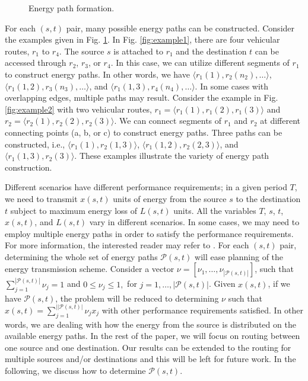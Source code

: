 \documentclass[journal]{IEEEtran}
\begin{document}
\begin{figure}[!t]
	\begin{center}
	\end{center}
	\caption{Energy path formation.}
  \label{fig:routeformation}
\end{figure}


For each $(s,t)$ pair, many possible energy paths can be constructed. Consider the examples given in Fig. \ref{fig:routeformation}. In Fig. \ref{fig:example1}, there are four vehicular routes, $r_1$ to $r_4$. The source $s$ is attached to $r_1$ and the destination $t$ can be accessed through $r_2$, $r_3$, or $r_4$. In this case, we can utilize different segments of $r_1$ to construct energy paths. In other words, we have $\langle r_1(1),r_2(n_2),\ldots \rangle$, $\langle r_1(1,2),r_3(n_3),\ldots \rangle$, and $\langle r_1(1,3),r_4(n_4),\ldots \rangle$. In some cases with overlapping edges, multiple paths may result. Consider the example in Fig. \ref{fig:example2} with two vehicular routes, $r_1=\langle r_1(1),r_1(2),r_1(3) \rangle$ and $r_2=\langle r_2(1),r_2(2),r_2(3) \rangle$. We can connect segments of $r_1$ and $r_2$ at different connecting points (a, b, or c) to construct energy paths. Three paths can be constructed, i.e., $\langle r_1(1),r_2(1,3)\rangle$, $\langle r_1(1,2),r_2(2,3)\rangle$, and $\langle r_1(1,3),r_2(3)\rangle$. These examples illustrate the variety of  energy path construction.

Different scenarios have different performance requirements; in a given period $T$, we need to transmit $x(s,t)$ units of energy from the source $s$ to the destination $t$ subject to maximum energy loss of $L(s,t)$ units. All the variables $T$, $s$, $t$, $x(s,t)$, and $L(s,t)$ vary in different scenarios. In some cases, we may need to employ multiple energy paths in order to satisfy the performance requirements. For more information, the interested reader may refer to \cite{VEN}. For each $(s,t)$ pair,  determining the whole set of energy paths $\mathcal{P}(s,t)$ will ease planning of the energy transmission scheme. 
Consider a vector $\nu = [\nu_1, \ldots, \nu_{|\mathcal{P}(s,t)|}]$, such that $\sum_{j=1}^{|\mathcal{P}(s,t)|}{\nu_j} =1$ and $0\leq \nu_j \leq 1,$ for $j=1,\ldots,|\mathcal{P}(s,t)|$. Given $x(s,t)$, if we have $\mathcal{P}(s,t)$, the problem will be reduced to determining $\nu$ such that $x(s,t) = \sum_{j=1}^{||\mathcal{P}(s,t)|}\nu_j x_j$ with other performance requirements satisfied.
In other words, we are dealing with how the energy from the source is distributed on the available energy paths. 
In the rest of the paper, we will focus on routing between one source and one destination. Our results can be extended to the routing for multiple sources and/or destinations  and this will be left for future work. 
In the following, we discuss how to determine $\mathcal{P}(s,t)$.
\end{document}
